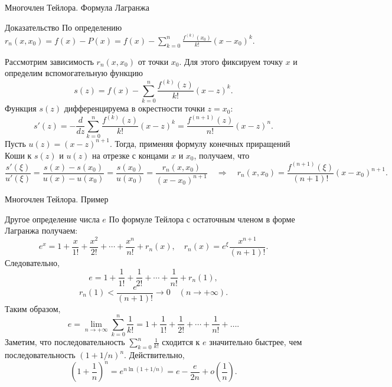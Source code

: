 \documentclass[8pt]{beamer}
\begin{document}
\begin{frame}{Многочлен Тейлора. Формула Лагранжа}
\begin{block}{Доказательство}
По определению $\displaystyle r_n(x, x_0)= f(x) -P(x) =f(x) - \sum_{k=0}^n \frac{f^{(k)}(x_0)}{k!}(x-x_0)^k.$

Рассмотрим зависимость $r_n(x, x_0)$ от точки $x_0$. Для этого фиксируем точку $x$ и определим вспомогательную функцию
$$s(z) =  f(x) - \sum_{k=0}^n \frac{f^{(k)}(z)}{k!}(x-z)^k.$$
Функция $s(z)$ дифференцируема в окрестности точки $z=x_0$:
$$s'(z) = -\frac{d}{dz}\sum_{k=0}^n \frac{f^{(k)}(z)}{k!}(x-z)^k  = \frac{f^{(n+1)}(z)}{n!}(x-z)^n.$$
Пусть $u(z) = (x-z)^{n+1}$. Тогда, применяя формулу конечных приращений Коши к $s(z)$ и $u(z)$ на отрезке с концами $x$ и $x_0$, получаем, что
$$ \frac{s'(\xi)}{u'(\xi)}=\frac{s(x) - s(x_0)}{u(x) - u(x_0)} =
\frac{s(x_0)}{ u(x_0)}=\frac{r_n(x,x_0)}{(x-x_0)^{n+1}}\quad \Rightarrow \quad 
r_n(x,x_0)=\frac{f^{(n+1)}(\xi)}{(n+1)!}(x-x_0)^{n+1}.
$$
\end{block}
\end{frame}

\begin{frame}{Многочлен Тейлора. Пример}
\begin{block}{Другое определение числа $e$}
По формуле Тейлора с остаточным членом в форме Лагранжа получаем:
$$e^x= 1+\frac{x}{1!} + \frac{x^2}{2!}+\cdots+\frac{x^{n}}{n!}+r_n(x),\quad r_n(x)=e^{\xi}\frac{x^{n+1}}{(n+1)!}.$$
Следовательно,
$$e=1+\frac{1}{1!} + \frac{1}{2!}+\cdots+\frac{1}{n!}+r_n(1),$$
$$r_n(1)<\frac{e}{(n+1)!}\to 0 \quad (n\to+\infty).$$
Таким образом,
$$e = \lim_{n\to+\infty}\sum_{k=0}^n \frac{1}{k!} = 1+\frac{1}{1!} + \frac{1}{2!}+\cdots+\frac{1}{n!}+\ldots.$$
Заметим, что последовательность $\sum\limits_{k=0}^n \frac{1}{k!}$ сходится к $e$ значительно быстрее, чем последовательность $(1+1/n)^n$. Действительно,
$$\left(1+\frac{1}{n}\right)^n = e^{n\ln(1+1/n)}= e - \frac{e}{2n} + o\left(\frac{1}{n}\right).
 $$
\end{block}
\end{frame}
\end{document}
